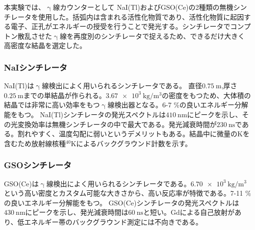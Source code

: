 \documentclass[../../main.tex]{subfiles}
\numberwithin{equation}{section}
\numberwithin{table}{section}
\numberwithin{figure}{section}
\begin{document}
    本実験では、$\upgamma$線カウンターとして NaI(Tl)およびGSO(Ce)の2種類の無機シンチレータを使用した。括弧内は含まれる活性化物質であり、活性化物質に起因する電子、正孔がエネルギーの授受を行うことで発光する。シンチレータでコンプトン散乱させた$\upgamma$線を再度別のシンチレータで捉えるため、できるだけ大きく高密度な結晶を選定した。


    \subsubsection{NaIシンチレータ}
    NaI(Tl)は$\upgamma$線検出によく用いられるシンチレータである。
    直径$\SI{0.75}{\meter}$,厚さ$\SI{0.25}{\meter}$までの単結晶が作られる。$\SI{3.67e3}{\kilogram\per\cubic\meter}$の密度をもつため、大体積の結晶では非常に高い効率をもつ$\upgamma$線検出器となる。6-7 \%の良いエネルギー分解能をもつ。
    NaI(Tl)シンチレータの発光スペクトルは$\SI{410}{\nano\meter}$にピークを示し、その光変換効率は無機シンチレータの中で最大である。発光減衰時間が$\SI{230}{\nano\second}$である。割れやすく、温度勾配に弱いというデメリットもある。結晶中に微量の$\text{K}$を含むため放射線核種$^{40}\text{K}$によるバックグラウンド計数を示す。

    \subsubsection{GSOシンチレータ}
    GSO(Ce)は$\upgamma$線検出によく用いられるシンチレータである。$\SI{6.70e3}{\kilogram\per\cubic\meter}$という高い密度とカスタム可能な大きさから、高い反応率が特徴である。7-11 \%の良いエネルギー分解能をもつ。
    GSO(Ce)シンチレータの発光スペクトルは$\SI{430}{\nano\meter}$にピークを示し、発光減衰時間は$\SI{60}{\nano\second}$と短い。Gdによる自己放射があり、低エネルギー帯のバックグラウンド測定には不向きである。
\end{document}
